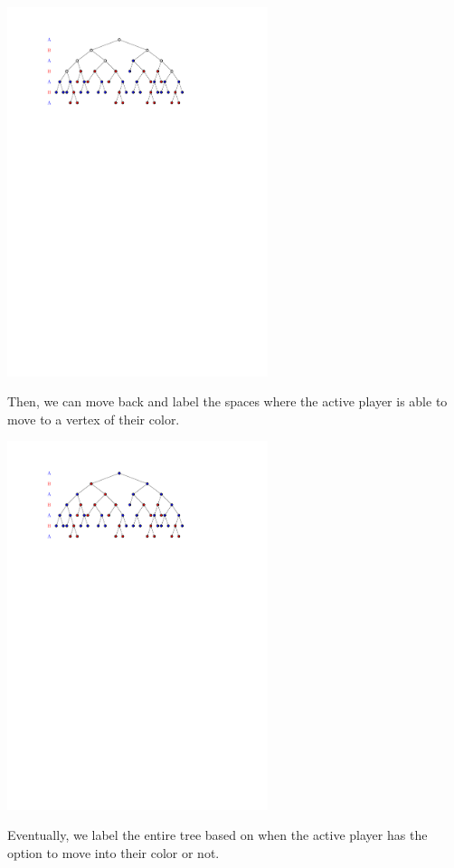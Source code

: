 \documentclass{beamer}
\theoremstyle{theorem}
\theoremstyle{definition}
\newcommand{\<}{\langle}
\renewcommand{\>}{\rangle}
\begin{document}
\begin{frame}
  \centerline{\includegraphics[width=3in]{decisionTree3.pdf}}

  \vspace{1em}

  Then, we can move back and label the spaces where the active player is able
  to move to a vertex of their color.
\end{frame}

\begin{frame}
  \centerline{\includegraphics[width=3in]{decisionTree4.pdf}}

  \vspace{1em}

  Eventually, we label the entire tree based on when the active player has
  the option to move into their color or not.
\end{frame}
\end{document}
